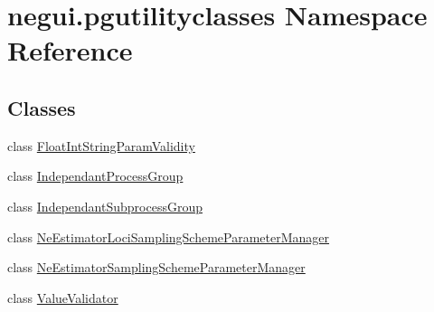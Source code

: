 \hypertarget{namespacenegui_1_1pgutilityclasses}{}\section{negui.\+pgutilityclasses Namespace Reference}
\label{namespacenegui_1_1pgutilityclasses}
\subsection*{Classes}
\begin{DoxyCompactItemize}
\item 
class \hyperlink{classnegui_1_1pgutilityclasses_1_1FloatIntStringParamValidity}{Float\+Int\+String\+Param\+Validity}
\item 
class \hyperlink{classnegui_1_1pgutilityclasses_1_1IndependantProcessGroup}{Independant\+Process\+Group}
\item 
class \hyperlink{classnegui_1_1pgutilityclasses_1_1IndependantSubprocessGroup}{Independant\+Subprocess\+Group}
\item 
class \hyperlink{classnegui_1_1pgutilityclasses_1_1NeEstimatorLociSamplingSchemeParameterManager}{Ne\+Estimator\+Loci\+Sampling\+Scheme\+Parameter\+Manager}
\item 
class \hyperlink{classnegui_1_1pgutilityclasses_1_1NeEstimatorSamplingSchemeParameterManager}{Ne\+Estimator\+Sampling\+Scheme\+Parameter\+Manager}
\item 
class \hyperlink{classnegui_1_1pgutilityclasses_1_1ValueValidator}{Value\+Validator}
\end{DoxyCompactItemize}

